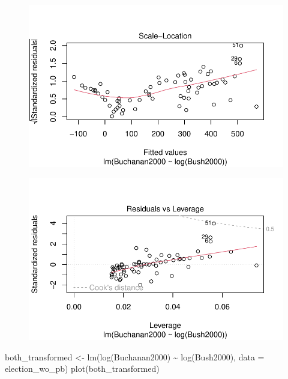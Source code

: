 \documentclass[
  letterpaper,
  DIV=11,
  numbers=noendperiod]{scrartcl}
\newenvironment{Shaded}{\begin{snugshade}}{\end{snugshade}}
\newcommand{\AttributeTok}[1]{\textcolor[rgb]{0.40,0.45,0.13}{#1}}
\newcommand{\FunctionTok}[1]{\textcolor[rgb]{0.28,0.35,0.67}{#1}}
\newcommand{\NormalTok}[1]{\textcolor[rgb]{0.00,0.23,0.31}{#1}}
\newcommand{\OtherTok}[1]{\textcolor[rgb]{0.00,0.23,0.31}{#1}}
\newcommand{\SpecialCharTok}[1]{\textcolor[rgb]{0.37,0.37,0.37}{#1}}
\begin{document}
\begin{figure}[H]

{\centering \includegraphics{case_study_1_files/figure-pdf/unnamed-chunk-3-3.pdf}

}

\end{figure}

\begin{figure}[H]

{\centering \includegraphics{case_study_1_files/figure-pdf/unnamed-chunk-3-4.pdf}

}

\end{figure}

\begin{Shaded}
\begin{Highlighting}[]
\NormalTok{both\_transformed }\OtherTok{\textless{}{-}} \FunctionTok{lm}\NormalTok{(}\FunctionTok{log}\NormalTok{(Buchanan2000) }\SpecialCharTok{\textasciitilde{}} \FunctionTok{log}\NormalTok{(Bush2000), }\AttributeTok{data =}\NormalTok{ election\_wo\_pb)}
\FunctionTok{plot}\NormalTok{(both\_transformed)}
\end{Highlighting}
\end{Shaded}
\end{document}
